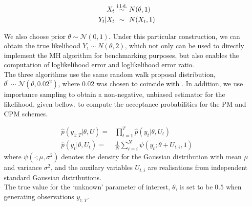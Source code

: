 \documentclass{article}
\begin{document}
  \begin{align*}
  X_t &\overset{\text{i.i.d.}}{\sim} N(\theta, 1) \\
  Y_t | X_t &\overset{\hphantom{\text{i.i.d.}}}{\sim} N(X_t, 1)
  \end{align*}

We also choose prior $\theta \sim \mathcal{N}(0,1)$. Under this particular construction, we can obtain the true likelihood $Y_t \sim N(\theta, 2)$, which not only can be used to directly implement the MH algorithm for benchmarking purposes, but also enables the computation of loglikelihood error and loglikelihood error ratio.\\

The three algorithms use the same random walk proposal distribution, $ \theta^\prime \sim \mathcal{N}(\theta, 0.02^2)$, where $0.02$ was chosen to coincide with \cite{cpmmDeligiannidis2015}. In addition, we use importance sampling to obtain a non-negative, unbiased estimator for the likelihood, given bellow, to compute the acceptance probabilities for the PM and CPM schemes.

\begin{align}
\hat{p}(y_{1:T}| \theta, U) =& \prod_{t=1}^{T} \hat{p}(y_t|\theta, U_t) \\
\hat{p}(y_t| \theta, U_t)=& \frac{1}{N} \sum_{i=i}^N \psi (y_t; \theta + U_{t,i}, 1)
\end{align}
where $\psi(\cdot; \mu, \sigma^2)$ denotes the density for the Gaussian distribution with mean $\mu$ and variance $\sigma^2$, and the auxilary variables $U_{t,i}$ are realisations from independent standard Gaussian distributions. \\

The true value for the `unknown' parameter of interest, $\theta$, is set to be $0.5$ when generating observations $y_{1:T}$.
\end{document}
